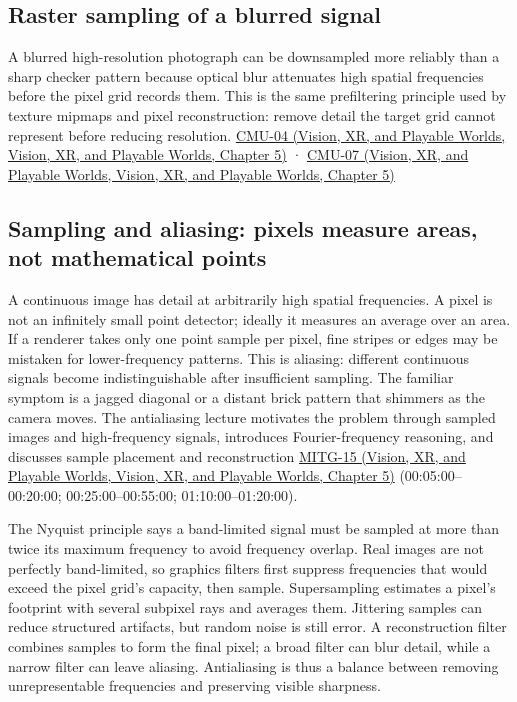 \subsection{Raster sampling of a blurred signal}\label{03-visual-computing-i-ch003-raster-sampling-of-a-blurred-signal}

A blurred high-resolution photograph can be downsampled more reliably than a sharp checker pattern because optical blur attenuates high spatial frequencies before the pixel grid records them. This is the same prefiltering principle used by texture mipmaps and pixel reconstruction: remove detail the target grid cannot represent before reducing resolution. \href{../07-Vision-XR-and-Playable-Worlds/main.pdf\#nameddest=04-visual-computing-ii-ch036-cmu-04---drawing-a-triangle-and-an-intro-to-sampling}{CMU-04 (Vision, XR, and Playable Worlds, Vision, XR, and Playable Worlds, Chapter 5)} · \href{../07-Vision-XR-and-Playable-Worlds/main.pdf\#nameddest=04-visual-computing-ii-ch036-cmu-07---perspective-projection-and-texture-mapping}{CMU-07 (Vision, XR, and Playable Worlds, Vision, XR, and Playable Worlds, Chapter 5)}

\subsection{Sampling and aliasing: pixels measure areas, not mathematical points}\label{03-visual-computing-i-ch003-sampling-and-aliasing-pixels-measure-areas-not-mathematical-points}

A continuous image has detail at arbitrarily high spatial frequencies. A pixel is not an infinitely small point detector; ideally it measures an average over an area. If a renderer takes only one point sample per pixel, fine stripes or edges may be mistaken for lower-frequency patterns. This is aliasing: different continuous signals become indistinguishable after insufficient sampling. The familiar symptom is a jagged diagonal or a distant brick pattern that shimmers as the camera moves. The antialiasing lecture motivates the problem through sampled images and high-frequency signals, introduces Fourier-frequency reasoning, and discusses sample placement and reconstruction \href{../07-Vision-XR-and-Playable-Worlds/main.pdf\#nameddest=04-visual-computing-ii-ch036-mitg-15---antialiasing}{MITG-15 (Vision, XR, and Playable Worlds, Vision, XR, and Playable Worlds, Chapter 5)} (00:05:00--00:20:00; 00:25:00--00:55:00; 01:10:00--01:20:00).

The Nyquist principle says a band-limited signal must be sampled at more than twice its maximum frequency to avoid frequency overlap. Real images are not perfectly band-limited, so graphics filters first suppress frequencies that would exceed the pixel grid's capacity, then sample. Supersampling estimates a pixel's footprint with several subpixel rays and averages them. Jittering samples can reduce structured artifacts, but random noise is still error. A reconstruction filter combines samples to form the final pixel; a broad filter can blur detail, while a narrow filter can leave aliasing. Antialiasing is thus a balance between removing unrepresentable frequencies and preserving visible sharpness.

